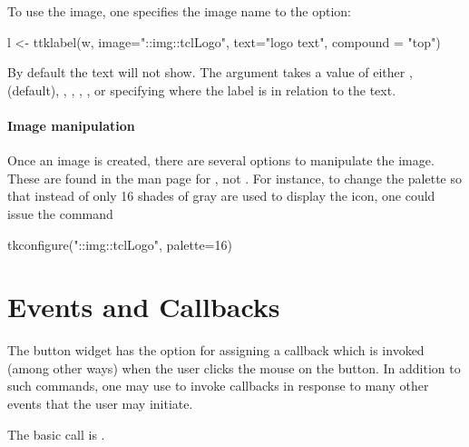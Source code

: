 To use the image, one specifies the image name to the
 option:
\begin{Schunk}
\begin{Sinput}
 l <- ttklabel(w, image="::img::tclLogo", text="logo text", 
               compound = "top")
\end{Sinput}
\end{Schunk}

By default the text will not show. The 
argument takes a value of either , 
(default), , , , ,
or  specifying where the label is in relation to the
text.

\paragraph{Image manipulation}
Once an image is created, there are several options to manipulate the
image. These are found in the \TK\/ man page for , not
. For instance, to change the palette so that instead of
 only 16 shades of gray are used to display the icon,
one could issue the command
\begin{Schunk}
\begin{Sinput}
 tkconfigure("::img::tclLogo", palette=16)
\end{Sinput}
\end{Schunk}




\section{Events and Callbacks}
\label{sec:tcltk:overview:events-callbacks}

The button widget has the  option for assigning a
callback which is invoked (among other ways) when the user clicks the
mouse on the button. In addition to such commands, one may use
 to invoke callbacks in response to many other events
that the user may initiate.

The basic call is . 


